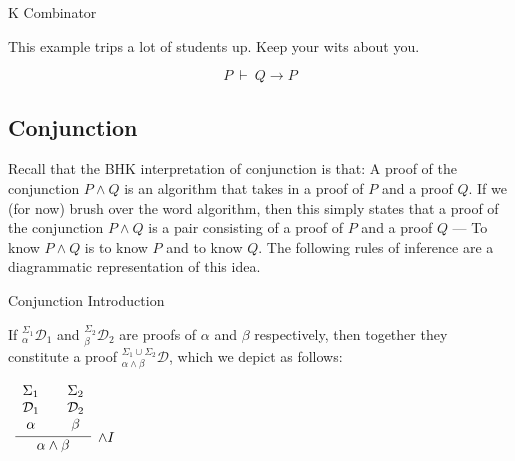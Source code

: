 \documentclass{book}
\begin{document}
    \begin{eg}{K Combinator}
        
        This example trips a lot of students up. Keep your wits about you.

        $$P \ \vdash \ Q \to P$$

    \end{eg}

    \newpage
    \subsection{Conjunction}

    Recall that the BHK interpretation of conjunction is that: A proof of the conjunction $P \land Q$ is an algorithm that takes in a proof of $P$ and a proof $Q$. If we (for now) brush over the word algorithm, then this simply states that a proof of the conjunction $P \land Q$ is a pair consisting of a proof of $P$ and a proof $Q$ --- To know $P \land Q$ is to know $P$ and to know $Q$. The following rules of inference are a diagrammatic representation of this idea. 

    \vspace{0.1cm}

    \begin{definition}{Conjunction Introduction}

        If $^{\Sigma_{1}}_{\alpha}\mathcal{D}_{1}$ and $^{\Sigma_{2}}_{\beta}\mathcal{D}_{2}$ are proofs of $\alpha$ and $\beta$ respectively, then together they constitute a proof $^{\Sigma_{1} \cup \Sigma_{2}}_{\alpha \land \beta}\mathcal{D}$, which we depict as follows: 

        \begin{center}
            $\begin{array}{c}
                \infer[\land I]{\alpha \land \beta}
                    {\begin{array}{c}
                        \Sigma_{1} \\
                        \mathcal{D}_{1} \\
                        \alpha
                    \end{array}
                    &
                    \begin{array}{c}
                        \Sigma_{2} \\
                        \mathcal{D}_{2} \\
                        \beta
                    \end{array}}
            \end{array}$
        \end{center}
    \end{definition}
\end{document}
